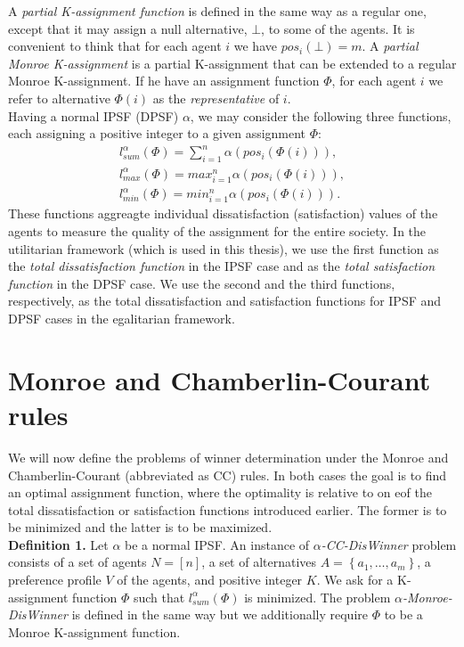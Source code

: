 A \textit{partial K-assignment function} is defined in the same way as a regular one, except that it may assign a null alternative, $\bot$, to some of the agents. It is convenient to think that for each agent $i$ we have $pos_{i}(\bot) = m$. A \textit{partial Monroe K-assignment} is a partial K-assignment that can be extended to a regular Monroe K-assignment. If he have an assignment function $\Phi$, for each agent $i$ we refer to alternative $\Phi(i)$ as the \textit{representative} of $i$.
\\

Having a normal IPSF (DPSF) $\alpha$, we may consider the following three functions, each assigning a positive integer to a given assignment $\Phi$:
\begin{gather}
	l^{\alpha}_{sum}(\Phi) = \sum^{n}_{i=1} \alpha (pos_{i}(\Phi(i))),\\
	l^{\alpha}_{max}(\Phi) = max^{n}_{i=1} \alpha (pos_{i}(\Phi(i))),\\
	l^{\alpha}_{min}(\Phi) = min^{n}_{i=1} \alpha (pos_{i}(\Phi(i))).
\end{gather}
These functions aggreagte individual dissatisfaction (satisfaction) values of the agents to measure the quality of the assignment for the entire society. In the utilitarian framework (which is used in this thesis), we use the first function as the \textit{total dissatisfaction function} in the IPSF case and as the \textit{total satisfaction function} in the DPSF case. We use the second and the third functions, respectively, as the total dissatisfaction and satisfaction functions for IPSF and DPSF cases in the egalitarian framework.

\section{Monroe and Chamberlin-Courant rules}

We will now define the problems of winner determination under the Monroe and Chamberlin-Courant (abbreviated as CC) rules. In both cases the goal is to find an optimal assignment function, where the optimality is relative to on eof the total dissatisfaction or satisfaction functions introduced earlier. The former is to be minimized and the latter is to be maximized.
\\

\noindent
\textbf{Definition 1.} Let $\alpha$ be a normal IPSF. An instance of $\alpha$\textit{-CC-DisWinner} problem consists of a set of agents $N = [n]$, a set of alternatives $A = \left\{ a_{1}, \ldots, a_{m} \right\}$, a preference profile $V$ of the agents, and positive integer $K$. We ask for a K-assignment function $\Phi$ such that $l^{\alpha}_{sum}(\Phi)$ is minimized. The problem $\alpha$\textit{-Monroe-DisWinner} is defined in the same way but we additionally require $\Phi$ to be a Monroe K-assignment function.
\\


